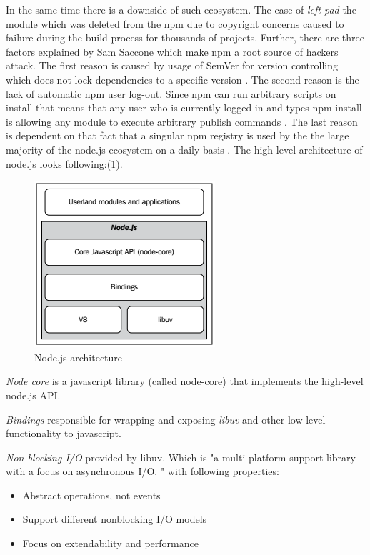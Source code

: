 In the same time there is a downside of such ecosystem. The case of \textit{left-pad} the module which was deleted from the npm due to copyright concerns caused to failure during the build process for thousands of projects\cite{npmDown}. Further, there are three factors explained by Sam Saccone \cite{npmHydra} \cite{npmSoft} which make npm a root source of hackers attack. The first reason is caused by usage of SemVer for version controlling which does not lock dependencies to a specific version \cite{npmHydra}. The second reason is the lack of automatic npm user log-out.  Since npm can run arbitrary scripts on install that means that any user who is currently logged in and types npm install is allowing any module to execute arbitrary publish commands \cite{npmHydra}. The last reason is dependent on that fact that a singular npm registry is used by the the large majority of the node.js ecosystem on a daily basis \cite{npmHydra}.
The high-level architecture of node.js looks following:(\ref{fig:nodeArch}). 
\begin{figure}[ht]
  	\label{fig:nodeArch}
    \centering
    \includegraphics[scale=1.0]{grafiken/nodeArchitecture.png}
     \caption{Node.js architecture \cite{nodejsbook}}
  \end{figure}

\textit{Node core} is a javascript library (called node-core) that implements the high-level node.js API.

\textit{Bindings} responsible for wrapping and exposing \textit{libuv} and other low-level functionality to javascript.\cite{nodejsbook}

\textit{Non blocking I/O} provided by libuv\cite{nodejsabout}\cite{nodejsbook}. 
Which is "a multi-platform support library with a focus on asynchronous I/O. "\cite{libuv} with following properties\cite{libuvBasic}:
\begin{itemize}
\item Abstract operations, not events
\item Support different nonblocking I/O models
\item Focus on extendability and performance
\end{itemize}

